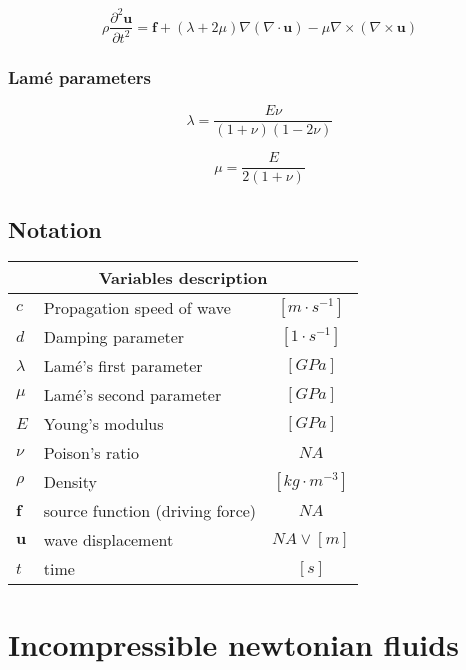 \documentclass[a4paper,10pt]{book}
\begin{document}
    \begin{equation}
    \rho\frac{\partial^2\mathbf{u}}{\partial{t}^2}=
    \mathbf{f}+\left(\lambda+2\mu\right)\nabla\left(\nabla\cdot\mathbf{u}\right)-
    \mu\nabla\times\left(\nabla\times\mathbf{u}\right)
    \end{equation}

\subsubsection{Lam\'{e} parameters}

    \begin{equation}
    \lambda=\frac{E\nu}{\left(1+\nu\right)\left(1-2\nu\right)}
    \end{equation}

    \begin{equation}
    \mu=\frac{E}{2\left(1+\nu\right)}
    \end{equation}

\subsection{Notation}

\begin{tabular}{|l|l|c|}
    \hline
    \multicolumn{3}{|c|}{Variables description} \\
    \hline
    $c$ & Propagation speed of wave & $[m\cdot{s^{-1}}]$ \\
    $d$ & Damping parameter & $[1\cdot{s^{-1}}]$ \\
    $\lambda$ & Lam\'{e}'s first parameter & $[GPa]$ \\
    $\mu$ & Lam\'{e}'s second parameter & $[GPa]$ \\
    $E$ & Young's modulus & $[GPa]$ \\
    $\nu$ & Poison's ratio & $NA$ \\
    $\rho$ & Density & $[kg\cdot{m^{-3}}]$ \\
    $\mathbf f$ & source function (driving force) & $NA$ \\
    $\mathbf u$ & wave displacement & $NA \vee [m]$ \\
    $t$ & time & $[s]$ \\
    \hline
\end{tabular}

\section{Incompressible newtonian fluids}
\end{document}
